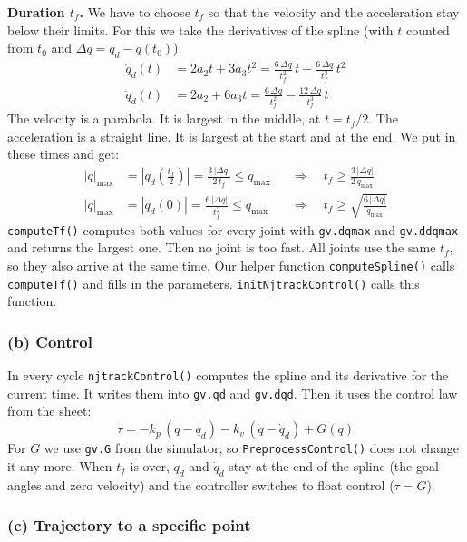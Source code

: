 \documentclass[11pt, a4paper]{article}
\begin{document}
\textbf{Duration $t_f$.} We have to choose $t_f$ so that the velocity and the acceleration stay below
their limits. For this we take the derivatives of the spline (with $t$ counted from $t_0$ and
$\Delta q = q_d - q(t_0)$):
\begin{align*}
  \dot q_d(t) &= 2 a_2 t + 3 a_3 t^2 = \frac{6\,\Delta q}{t_f^2}\,t - \frac{6\,\Delta q}{t_f^3}\,t^2 \\
  \ddot q_d(t) &= 2 a_2 + 6 a_3 t = \frac{6\,\Delta q}{t_f^2} - \frac{12\,\Delta q}{t_f^3}\,t
\end{align*}
The velocity is a parabola. It is largest in the middle, at $t = t_f/2$. The acceleration is a
straight line. It is largest at the start and at the end. We put in these times and get:
\begin{align*}
  |\dot q|_{\max} &= \left|\dot q_d\!\left(\tfrac{t_f}{2}\right)\right| = \frac{3\,|\Delta q|}{2\, t_f} \le \dot q_{\max}
  &&\Rightarrow\quad t_f \ge \frac{3\,|\Delta q|}{2\, \dot q_{\max}} \\
  |\ddot q|_{\max} &= |\ddot q_d(0)| = \frac{6\,|\Delta q|}{t_f^2} \le \ddot q_{\max}
  &&\Rightarrow\quad t_f \ge \sqrt{\frac{6\,|\Delta q|}{\ddot q_{\max}}}
\end{align*}
\texttt{computeTf()} computes both values for every joint with \texttt{gv.dqmax} and
\texttt{gv.ddqmax} and returns the largest one. Then no joint is too fast. All joints use the same
$t_f$, so they also arrive at the same time. Our helper function \texttt{computeSpline()} calls
\texttt{computeTf()} and fills in the parameters. \texttt{initNjtrackControl()} calls this function.

\subsubsection*{(b) Control}

In every cycle \texttt{njtrackControl()} computes the spline and its derivative for the current time.
It writes them into \texttt{gv.qd} and \texttt{gv.dqd}. Then it uses the control law from the sheet:
\[
  \tau = -k_p\,(q - q_d) - k_v\,(\dot q - \dot q_d) + G(q)
\]
For $G$ we use \texttt{gv.G} from the simulator, so \texttt{PreprocessControl()} does not change it
any more. When $t_f$ is over, $q_d$ and $\dot q_d$ stay at the end of the spline (the goal angles and
zero velocity) and the controller switches to float control ($\tau = G$).

\subsubsection*{(c) Trajectory to a specific point}
\end{document}
